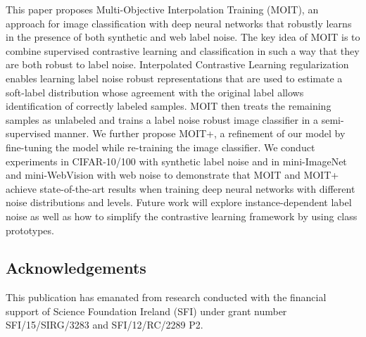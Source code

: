\documentclass[final]{cvpr}
\begin{document}
This paper proposes Multi-Objective Interpolation Training (MOIT), an approach for image classification with deep neural networks that robustly learns in the presence of both synthetic and web label noise. The key idea of MOIT is to combine supervised contrastive learning and classification in such a way that they are both robust to label noise. Interpolated Contrastive Learning regularization enables learning label noise robust representations that are used to estimate a soft-label distribution whose agreement with
the original label allows identification of correctly labeled samples. MOIT then treats the remaining samples as unlabeled and trains a label noise robust image classifier in a semi-supervised manner. We further propose MOIT+, a refinement of our model by fine-tuning the model while re-training the image classifier. We conduct experiments in CIFAR-10/100 with synthetic label noise and in mini-ImageNet and mini-WebVision with web noise to demonstrate that MOIT and MOIT+ achieve state-of-the-art results when training deep neural networks with different noise distributions and levels. Future work will explore instance-dependent label noise as well as how to simplify the contrastive learning framework by using class prototypes.

\subsection*{Acknowledgements}
This publication has emanated from research conducted with the financial support of Science Foundation Ireland (SFI) under grant number SFI/15/SIRG/3283 and SFI/12/RC/2289 P2.

{\small{}{}{} 

 } 
\end{document}

